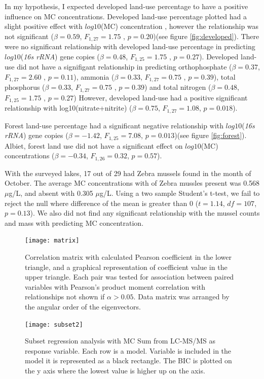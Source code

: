 In my hypothesis, I expected developed land-use percentage to have a positive influence on MC concentrations. Developed land-use percentage plotted had a slight positive effect with $log10$(MC) concentration , however the relationship was not significant  ($\beta=0.59$, $F_{{1,27}}=1.75$ , $p=0.20$)(see figure \ref{fig:developed}). There were no significant relationship with developed land-use percentage in predicting $log10$(\emph{16s rRNA}) gene copies ($\beta=0.48$, $F_{{1,25}}=1.75$ , $p=0.27$). Developed land-use did not have a signifigant relationship in predicting orthophosphate ($\beta=0.37$, $F_{{1,27}}=2.60$ , $p=0.11$), ammonia ($\beta=0.33$, $F_{{1,27}}=0.75$ , $p=0.39$), total phosphorus  ($\beta=0.33$, $F_{{1,27}}=0.75$ , $p=0.39$) and total nitrogen ($\beta=0.48$, $F_{{1,25}}=1.75$ , $p=0.27$) However, developed land-use had a positive significant relationship with log10(nitrate+nitrite) ($\beta=0.75$, $F_{{1,27}}=1.08$, $p=0.018$). 

Forest land-use percentage had a significant negative relationship with $log10$(\emph{16s rRNA}) gene copies ($\beta=-1.42$, $F_{{1,25}}=7.08$, $p=0.013$)(see figure \ref{fig:forest}). Albiet, forest land use did not have a significant effect on $log10$(MC) concentrations ($\beta=-0.34$, $F_{{1,26}}=0.32$, $p=0.57$).

With the surveyed lakes, 17 out of 29 had Zebra mussels found in the month of October. The average MC concentrations with  of Zebra mussles present was 0.568 $\mu$g/L, and absent with 0.305 $\mu$g/L. Using a two sample Student's t-test, we fail to reject the null where difference of the mean is greater than 0 ($t=1.14$, $df=107$, $p=0.13$). We also did not find any significant relationship with the mussel counts and mass with predicting MC concentration.



\begin{figure}
	\texttt{[image: matrix]}
	\vspace*{-15mm}
	\caption{
  Correlation matrix with calculated Pearson coefficient in the lower triangle, and a graphical representation of coefficient value in the upper triangle. Each pair was tested for association between paired variables with Pearson's product moment correlation with relationships not shown if $\alpha>0.05$. Data matrix was arranged by the angular order of the eigenvectors.}
	\label{matrix}
\end{figure}


\begin{figure}[!ht]
	\texttt{[image: subset2]}
  	\vspace*{-15mm}
	\caption{Subset regression analysis with MC Sum from LC-MS/MS as response variable. Each row is a model. Variable is included in the model it is represented as a black rectangle. The BIC is plotted on the y axis where the lowest value is higher up on the axis.}
	\label{fig:subset}
\end{figure}


